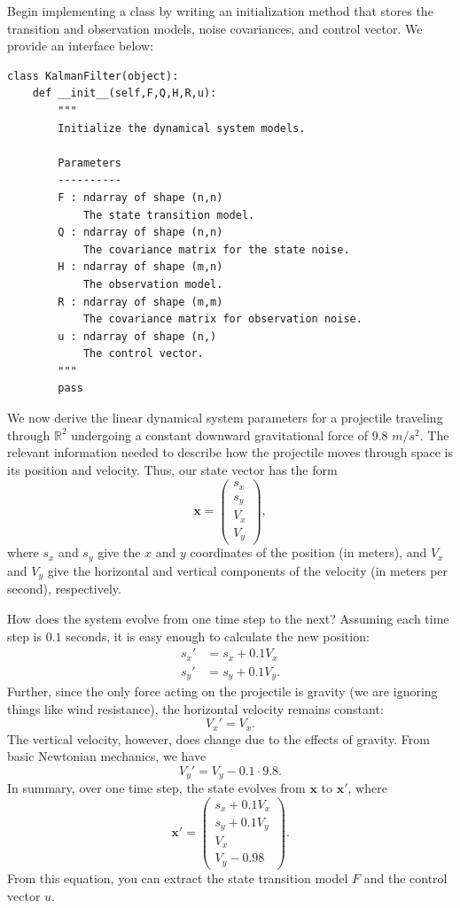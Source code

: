 \begin{problem}
Begin implementing a  class by writing an initialization method that stores the transition and observation models, noise covariances, and control vector.
We provide an interface below:
\begin{lstlisting}
class KalmanFilter(object):
    def __init__(self,F,Q,H,R,u):
        """
        Initialize the dynamical system models.

        Parameters
        ----------
        F : ndarray of shape (n,n)
            The state transition model.
        Q : ndarray of shape (n,n)
            The covariance matrix for the state noise.
        H : ndarray of shape (m,n)
            The observation model.
        R : ndarray of shape (m,m)
            The covariance matrix for observation noise.
        u : ndarray of shape (n,)
            The control vector.
        """
        pass
\end{lstlisting}
\end{problem}

We now derive the linear dynamical system parameters for a projectile traveling through $\mathbb{R}^2$ undergoing a constant downward gravitational force of 9.8 $m/s^2$.
The relevant information needed to describe how the projectile moves through space is its position and velocity.
Thus, our state vector has the form
\[
\mathbf{x} = \left( \begin{array}{c} s_{x} \\ s_{y} \\ V_{x} \\ V_{y} \end{array} \right),
\]
where $s_x$ and $s_y$ give the $x$ and $y$ coordinates of the position (in meters), and $V_x$ and $V_y$ give the horizontal and vertical components of the velocity (in meters per second), respectively.

How does the system evolve from one time step to the next?
Assuming each time step is $0.1$ seconds, it is easy enough to calculate the new position:
\begin{align*}
s_x' &= s_x + 0.1V_x\\
s_y' &= s_y + 0.1V_y.
\end{align*}
Further, since the only force acting on the projectile is gravity (we are ignoring things like wind resistance), the horizontal velocity remains constant:
\[
V_x' = V_x.
\]
The vertical velocity, however, does change due to the effects of gravity.
From basic Newtonian mechanics, we have
\[
V_y' = V_y - 0.1\cdot9.8.
\]
In summary, over one time step, the state evolves from $\mathbf{x}$ to $\mathbf{x}'$, where
\[
\mathbf{x}' = \left( \begin{array}{c} s_{x} + 0.1V_x \\ s_{y} + 0.1V_y \\ V_{x} \\ V_{y} - 0.98 \end{array} \right).
\]
From this equation, you can extract the state transition model $F$ and the control vector $u$.

